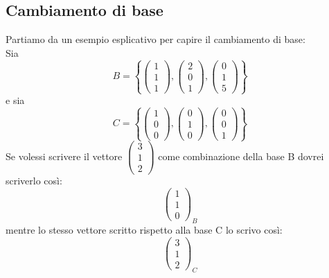 \documentclass[]{article}
\begin{document}
\subsection*{Cambiamento di base}
Partiamo da un esempio esplicativo per capire il cambiamento di base: \\
Sia $$B = \left\{ \left( \begin{array}{c} 1\\1\\1\end{array} \right), \left( \begin{array}{c} 2\\0\\1\end{array} \right),\left( \begin{array}{c} 0\\1\\5\end{array} \right)\right\}$$
e sia
$$C = \left\{ \left( \begin{array}{c} 1\\0\\0\end{array} \right), \left( \begin{array}{c} 0\\1\\0\end{array} \right),\left( \begin{array}{c} 0\\0\\1\end{array} \right)\right\}$$
Se volessi scrivere il vettore $\left( \begin{array}{c} 3\\1\\2\end{array} \right)$ come combinazione della base B dovrei scriverlo così: $$\left( \begin{array}{c} 1\\1\\0\end{array} \right)_B$$
mentre lo stesso vettore scritto rispetto alla base C lo scrivo così: $$\left( \begin{array}{c} 3\\1\\2\end{array} \right)_C$$
\end{document}
